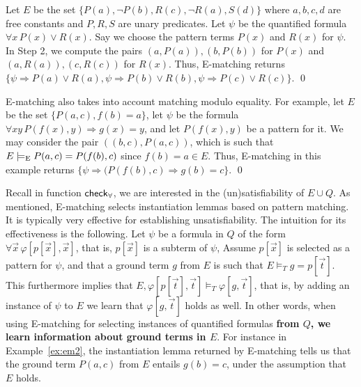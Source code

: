 \documentclass[oribibl]{llncs}
\begin{document}
\begin{example}
\label{ex:em2}
Let $E$ be the set $\{ P(a), \neg P(b), R(c), \neg R(a), S(d) \}$ where $a,b,c,d$ are free constants and $P,R,S$ are unary predicates.
Let $\psi$ be the quantified formula $\forall x\, P( x ) \vee R( x )$.
Say we choose the pattern terms $P( x )$ and $R( x )$ for $\psi$.
In Step 2, we compute the pairs $( a, P( a ) ), ( b, P( b ) )$ for $P( x )$ and
$( a, R( a ) ), ( c, R( c ) )$ for $R( x )$.
Thus, E-matching returns $\{
\psi \Rightarrow P( a ) \vee R( a ), \psi \Rightarrow P( b ) \vee R( b ), \psi \Rightarrow P( c ) \vee R( c )
\}$.
\qed
\end{example}

\begin{example}
\label{ex:em2}
E-matching also takes into account matching modulo equality.
For example, let $E$ be the set $\{ P( a, c ), f( b ) = a \}$,
let $\psi$ be the formula $\forall xy\, P( f( x ), y ) \Rightarrow g( x ) = y$,
and let $P( f( x ), y )$ be a pattern for it.
We may consider the pair $( ( b, c ), P( a, c ) )$, which is such that $E \models_\mathrm{E} P( a, c ) = P( f( b ), c )$ since $f( b ) = a \in E$.
Thus, E-matching in this example returns $\{ \psi \Rightarrow ( P( f( b ), c ) \Rightarrow g( b ) = c \}$.
\qed
\end{example}

Recall in function $\small\mathsf{check}_\forall$, we are interested in the (un)satisfiability of $E \cup Q$.
As mentioned, E-matching selects instantiation lemmas based on pattern matching.
It is typically very effective for establishing unsatisfiability.
The intuition for its effectiveness is the following. 
Let $\psi$ be a formula in $Q$ of the form $\forall \vec x\, \varphi[ p[ \vec x ], \vec x ]$, 
that is, $p[ \vec x ]$ is a subterm of $\psi$,
Assume $p[ \vec x ]$ is selected as a pattern for $\psi$, and
that a ground term $g$ from $E$ is such that $E \models_T g = p[ \vec t ]$.
This furthermore implies that $E, \varphi[ p[ \vec t ], \vec t ] \models_T \varphi[ g, \vec t ]$,
that is, by adding an instance of $\psi$ to $E$ we learn that $\varphi[ g, \vec t ]$ holds as well.
In other words, when using E-matching for selecting instances of quantified formulas {\bf from $Q$, 
we learn information about ground terms in $E$}.
For instance in Example~\ref{ex:em2}, the instantiation lemma returned by E-matching tells us
that the ground term $P( a, c )$ from $E$ entails $g( b ) = c$, under the assumption that $E$ holds.
\end{document}
